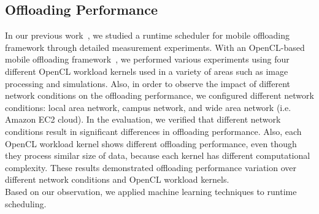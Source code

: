 \documentclass[10pt, conference, compsocconf]{IEEEtran}
\begin{document}
\subsection{Offloading Performance}
%
In our previous work~\cite{ml}, we studied a runtime scheduler for
mobile offloading framework through detailed measurement experiments.
%
With an OpenCL-based mobile offloading framework~\cite{ocloff}, we
performed various experiments using four different OpenCL workload
kernels used in a variety of areas such as image processing and
simulations.
%
Also, in order to observe the impact of different network conditions on
the offloading performance, we configured different network conditions:
local area network, campus network, and wide area network (i.e. Amazon
EC2 cloud).
%
In the evaluation, we verified that different network conditions result
in significant differences in offloading performance.
%
%
%
%
Also, each OpenCL workload kernel shows different offloading
performance, even though they process similar size of data, because each
kernel has different computational complexity.
%
These results demonstrated offloading performance
variation over different network conditions and OpenCL workload
kernels.\\
%
%
%
\indent Based on our observation, we applied machine learning techniques
to runtime scheduling.
%
%
\end{document}
